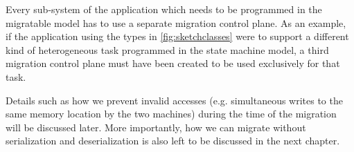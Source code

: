 Every sub-system of the application which needs to be programmed in the
migratable model has to use a separate migration control plane. As an
example, if the application using the types in \autoref{fig:sketchclasses}
were to support a different kind of heterogeneous task programmed in the
state machine model, a third migration control plane must have been created to
be used exclusively for that task.

Details such as how we prevent invalid accesses (e.g. simultaneous writes
to the same memory location by the two machines)
during the time of the migration will be discussed later.
More importantly, how we can migrate without serialization and deserialization
is also left to be discussed in the next chapter.
